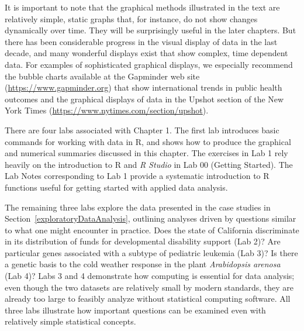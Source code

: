 It is important to note that the graphical methods illustrated in the text are relatively simple, static graphs that, for instance, do not show changes dynamically over time. They will be surprisingly useful in the later chapters. But there has been considerable progress in the visual display of data in the last decade, and many wonderful displays exist that show complex, time dependent data.  For examples of sophisticated graphical displays, we especially recommend the bubble charts available at the Gapminder web site (\url{https://www.gapminder.org}) that show international trends in public health outcomes and the graphical displays of data in the Upshot section of the New York Times (\url{https://www.nytimes.com/section/upshot}).

There are four labs associated with Chapter 1.  The first lab introduces basic commands for working with data in \textsf{R}, and shows how to produce the graphical and numerical summaries discussed in this chapter.  The exercises in Lab 1 rely heavily on the introduction to \textsf{R} and \textit{R Studio} in Lab 00 (Getting Started). The Lab Notes corresponding to Lab 1 provide a systematic introduction to \textsf{R} functions useful for getting started with applied data analysis.

The remaining three labs explore the data presented in the case studies in Section~\ref{exploratoryDataAnalysis}, outlining analyses driven by questions similar to what one might encounter in practice.  Does the state of California discriminate in its distribution of funds for developmental disability support (Lab 2)?  Are particular genes associated with a subtype of pediatric leukemia (Lab 3)?  Is there a genetic basis to the cold weather response in the plant \textit{Arabidopsis arenosa} (Lab 4)? Labs 3 and 4 demonstrate how computing is essential for data analysis; even though the two datasets are relatively small by modern standards, they are already too large to feasibly analyze without statistical computing software. All three labs illustrate how important questions can be examined even with relatively simple statistical concepts.



